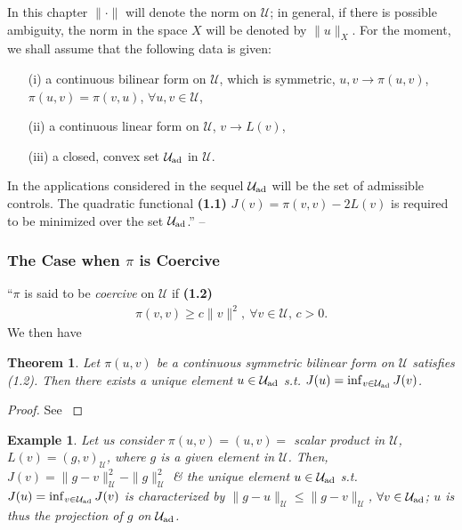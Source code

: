 \documentclass[oneside]{book}
\numberwithin{equation}{section}
\newtheorem{example}{Example}[chapter]
\newtheorem{theorem}{Theorem}[chapter]
\begin{document}
In this chapter $\|\cdot\|$ will denote the norm on $\mathcal{U}$; in general, if there is possible ambiguity, the norm in the space $X$ will be denoted by $\|u\|_X$. For the moment, we shall assume that the following data is given:
\begin{itemize}
	\item[(i)] a continuous bilinear form on $\mathcal{U}$, which is symmetric, $u,v\to\pi(u,v)$, $\pi(u,v) = \pi(v,u)$, $\forall u,v\in\mathcal{U}$,
	\item[(ii)] a continuous linear form on $\mathcal{U}$, $v\to L(v)$,
	\item[(iii)] a closed, convex set $\mathcal{U}_{\rm ad}$ in $\mathcal{U}$.
\end{itemize}
In the applications considered in the sequel $\mathcal{U}_{\rm ad}$ will be the set of admissible controls. The quadratic functional \textbf{(1.1)} $J(v) = \pi(v,v) - 2L(v)$ is required to be minimized over the set $\mathcal{U}_{\rm ad}$.'' -- \cite[p. 6]{Lions1971}

\subsubsection{The Case when $\pi$ is Coercive}
``$\pi$ is said to be \textit{coercive} on $\mathcal{U}$ if \textbf{(1.2)}
\begin{align*}
	\pi(v,v)\ge c\|v\|^2,\ \forall v\in\mathcal{U},\,c > 0.
\end{align*}
We then have

\begin{theorem}
	Let $\pi(u,v)$ be a continuous symmetric bilinear form on $\mathcal{U}$ satisfies (1.2). Then there exists a unique element $u\in\mathcal{U}_{\rm ad}$ s.t. $J(u) = \inf_{v\in\mathcal{U}_{\rm ad}} J(v)$.
\end{theorem}

\begin{proof}
	See \cite[pp. 7--]{Lions1971}
\end{proof}

\begin{example}
	Let us consider $\pi(u,v) = (u,v) =$ scalar product in $\mathcal{U}$, $L(v) = (g,v)_\mathcal{U}$, where $g$ is a given element in $\mathcal{U}$. Then, $J(v) = \|g - v\|_\mathcal{U}^2 - \|g\|_\mathcal{U}^2$ \& the unique element $u\in\mathcal{U}_{\rm ad}$ s.t. $J(u) = \inf_{v\in\mathcal{U}_{\rm ad}} J(v)$ is characterized by $\|g - u\|_\mathcal{U}\le\|g - v\|_\mathcal{U}$, $\forall v\in\mathcal{U}_{\rm ad}$; $u$ is thus the projection of $g$ on $\mathcal{U}_{\rm ad}$.
\end{example}
\end{document}
